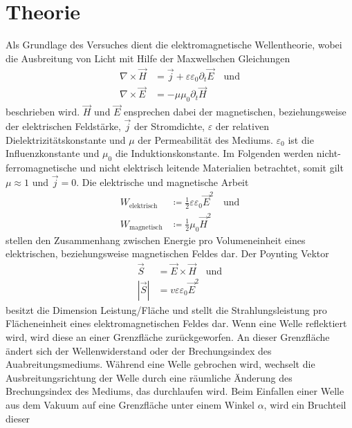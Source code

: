 \section{Theorie}
\label{sec:theorie}

Als Grundlage des Versuches dient die elektromagnetische Wellentheorie, wobei die Ausbreitung von Licht 
mit Hilfe der Maxwellschen Gleichungen 
\begin{align}
    \nabla \times \vec{H}&=\vec{j}+\varepsilon \varepsilon_{0} \partial_t \vec{E} \quad \text{und} \\
    \nabla \times \vec{E}&=-\mu \mu_{0} \partial_t \vec{H}
    \label{eqn:maxwell}
\end{align}
beschrieben wird. $\vec{H} $ und $\vec{E}$ ensprechen dabei der magnetischen, beziehungsweise der elektrischen Feldstärke,
$\vec{j} $ der Stromdichte, $\varepsilon$ der relativen Dielektrizitätskonstante und $\mu$ der Permeabilität des Mediums. $\varepsilon_0$
ist die Influenzkonstante und $\mu_0$ die Induktionskonstante.
Im Folgenden werden nicht-ferromagnetische und nicht elektrisch leitende Materialien betrachtet, somit gilt $\mu \approx 1$
und $\vec{j} =0$.
Die elektrische und magnetische Arbeit 
\begin{align*}
    W_\text{{elektrisch}} &\coloneq \frac{1}{2} \varepsilon \varepsilon_0 \vec{E}^2 \quad \text{und}\\
    W_{\text{magnetisch}} &\coloneq \frac{1}{2} \mu_0 \vec{H}^2
\end{align*}
stellen den Zusammenhang zwischen Energie pro Volumeneinheit eines elektrischen, beziehungsweise magnetischen Feldes dar.
Der Poynting Vektor 
\begin{align}
    \vec{S} &= \vec{E} \times \vec{H} \quad  \text{und}\\
    |\vec{S}| &= v \varepsilon \varepsilon_0 \vec{E}^2
    \label{eqn:poynting}
\end{align}
besitzt die Dimension Leistung/Fläche und stellt die Strahlungsleistung pro Flächeneinheit eines 
elektromagnetischen Feldes dar. Wenn eine Welle reflektiert wird, wird diese an einer Grenzfläche zurückgeworfen.
An dieser Grenzfläche ändert sich der Wellenwiderstand oder der Brechungsindex des Auabreitungsmediums.
Während eine Welle gebrochen wird, wechselt die Ausbreitungsrichtung der Welle durch eine räumliche Änderung des Brechungsindex
des Mediums, das durchlaufen wird.
Beim Einfallen einer Welle aus dem Vakuum auf eine Grenzfläche unter einem Winkel $\alpha$, wird ein Bruchteil dieser

